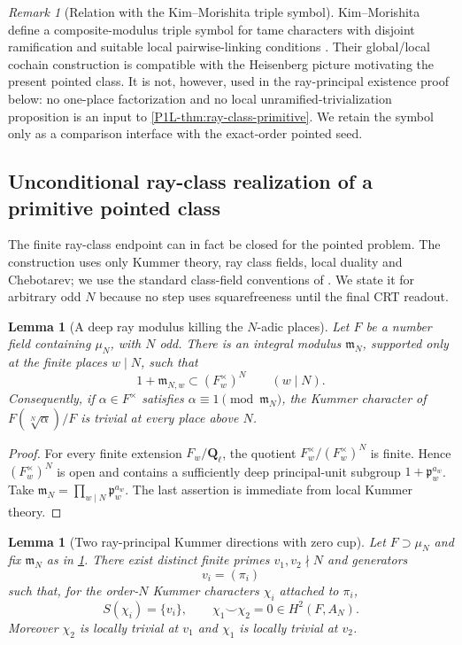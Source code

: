 \documentclass[11pt]{article}
\newtheorem{lemma}[theorem]{Lemma}
\theoremstyle{remark}
\newtheorem{remark}[theorem]{Remark}
\providecommand{\Q}{\mathbf Q}
\begin{document}
\begin{remark}[Relation with the Kim--Morishita triple symbol]
\label{P1L-rem:kim-morishita-relation}
Kim--Morishita define a composite-modulus triple symbol for tame characters
with disjoint ramification and suitable local pairwise-linking conditions
\cite{KimMorishita}.  Their global/local cochain construction is compatible
with the Heisenberg picture motivating the present pointed class.  It is not,
however, used in the ray-principal existence proof below: no one-place
factorization and no local unramified-trivialization proposition is an input
to \cref{P1L-thm:ray-class-primitive}.  We retain the symbol only as a comparison
interface with the exact-order pointed seed.
\end{remark}

\subsection{Unconditional ray-class realization of a primitive pointed class}

The finite ray-class endpoint can in fact be closed for the pointed problem.  The construction uses only Kummer theory, ray class fields, local duality and Chebotarev; we use the standard class-field conventions of \cite{NeukirchANT}.  We state it for arbitrary odd $N$ because no step uses squarefreeness until the final CRT readout.

\begin{lemma}[A deep ray modulus killing the $N$-adic places]\label{P1L-lem:deep-ray-modulus}
Let $F$ be a number field containing $\mu_N$, with $N$ odd.  There is an integral modulus $\mathfrak m_N$, supported only at the finite places $w\mid N$, such that
\[
 1+\mathfrak m_{N,w}\subset (F_w^\times)^N
 \qquad (w\mid N).
\]
Consequently, if $\alpha\in F^\times$ satisfies $\alpha\equiv1\pmod{\mathfrak m_N}$, the Kummer character of $F(\sqrt[N]{\alpha})/F$ is trivial at every place above $N$.
\end{lemma}

\begin{proof}
For every finite extension $F_w/\Q_\ell$, the quotient $F_w^\times/(F_w^\times)^N$ is finite.  Hence $(F_w^\times)^N$ is open and contains a sufficiently deep principal-unit subgroup $1+\mathfrak p_w^{a_w}$.  Take $\mathfrak m_N=\prod_{w\mid N}\mathfrak p_w^{a_w}$.  The last assertion is immediate from local Kummer theory.
\end{proof}

\begin{lemma}[Two ray-principal Kummer directions with zero cup]\label{P1L-lem:first-two-rays}
Let $F\supset\mu_N$ and fix $\mathfrak m_N$ as in \cref{P1L-lem:deep-ray-modulus}.  There exist distinct finite primes $v_1,v_2\nmid N$ and generators
\[
 v_i=(\pi_i)
\]
such that, for the order-$N$ Kummer characters $\chi_i$ attached to $\pi_i$,
\[
 S(\chi_i)=\{v_i\},\qquad
 \chi_1\smile\chi_2=0\in H^2(F,A_N).
\]
Moreover $\chi_2$ is locally trivial at $v_1$ and $\chi_1$ is locally trivial at $v_2$.
\end{lemma}
\end{document}
